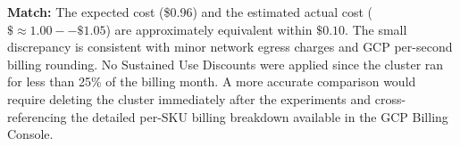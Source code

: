 \textbf{Match:} The expected cost (\$0.96) and the estimated actual cost 
($\${\approx}1.00--\$1.05$) are approximately equivalent within $ \$0.10$. 
The small discrepancy is consistent with minor network egress charges 
and GCP per-second billing rounding. No Sustained Use Discounts were 
applied since the cluster ran for less than 25\% of the billing month. 
A more accurate comparison would require deleting the cluster immediately 
after the experiments and cross-referencing the detailed per-SKU billing 
breakdown available in the GCP Billing Console.


\newpage
